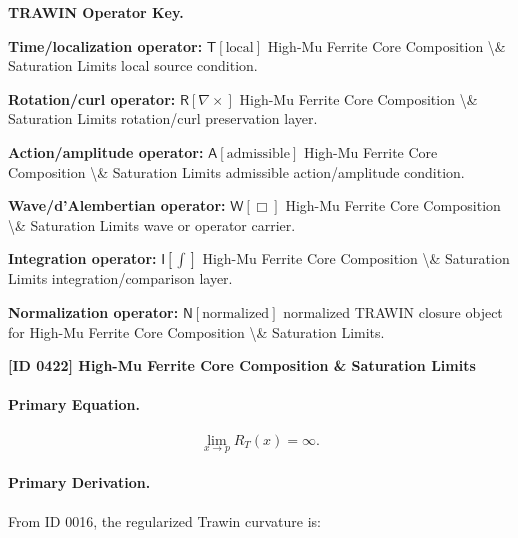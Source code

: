 \par\vspace{0.45\baselineskip}
\noindent\begin{minipage}[t]{\linewidth}
\begingroup
\small
\raggedright
\textbf{TRAWIN Operator Key.}\par
\noindent\textbf{Time/localization operator:} $\mathsf{T}\!\left[\mathrm{local}\right]$ High-Mu Ferrite Core Composition \textbackslash{}\& Saturation Limits local source condition.\par
\noindent\textbf{Rotation/curl operator:} $\mathsf{R}\!\left[\nabla\times\right]$ High-Mu Ferrite Core Composition \textbackslash{}\& Saturation Limits rotation/curl preservation layer.\par
\noindent\textbf{Action/amplitude operator:} $\mathsf{A}\!\left[\mathrm{admissible}\right]$ High-Mu Ferrite Core Composition \textbackslash{}\& Saturation Limits admissible action/amplitude condition.\par
\noindent\textbf{Wave/d'Alembertian operator:} $\mathsf{W}\!\left[\Box\right]$ High-Mu Ferrite Core Composition \textbackslash{}\& Saturation Limits wave or operator carrier.\par
\noindent\textbf{Integration operator:} $\mathsf{I}\!\left[\int\right]$ High-Mu Ferrite Core Composition \textbackslash{}\& Saturation Limits integration/comparison layer.\par
\noindent\textbf{Normalization operator:} $\mathsf{N}\!\left[\mathrm{normalized}\right]$ normalized TRAWIN closure object for High-Mu Ferrite Core Composition \textbackslash{}\& Saturation Limits.\par
\endgroup
\end{minipage}

\clearpage
\noindent\textbf{[ID 0422] High-Mu Ferrite Core Composition \& Saturation Limits}\par
\vspace{0.35em}
\paragraph{Primary Equation.}
\begin{equation}
\lim_{x\to p}R_T(x)=\infty .
\end{equation}

\paragraph{Primary Derivation.}
From ID 0016, the regularized Trawin curvature is:

